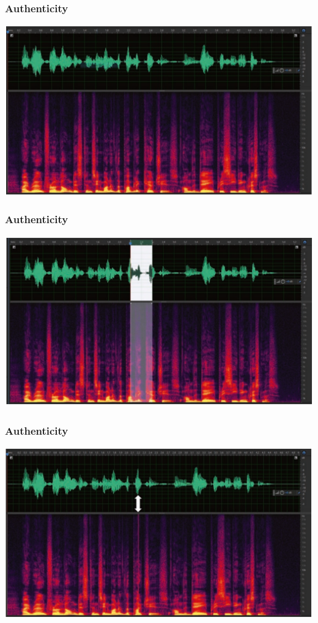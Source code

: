 \documentclass[pdflatex,compress]{beamer}
\begin{document}
\begin{frame}
	\frametitle{Authenticity}

	\begin{center}
		\includegraphics[width=0.8\linewidth]{img/img001}
	\end{center}
	
\end{frame}

\begin{frame}
	\frametitle{Authenticity}
	
	\begin{center}
		\includegraphics[width=0.8\linewidth]{img/img002}
	\end{center}
	
\end{frame}

\begin{frame}
	\frametitle{Authenticity}
	
	\begin{center}
		\includegraphics[width=0.8\linewidth]{img/img003}
	\end{center}
	
\end{frame}
\end{document}
